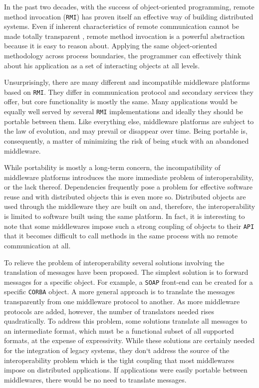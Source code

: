 In the past two decades, with the success of object-oriented programming, remote method invocation (\texttt{RMI})
has proven itself an effective way of building distributed systems. Even if inherent characteristics
of remote communication cannot be made totally transparent \cite{Kendall}, remote method
invocation is a powerful abstraction because it is easy to reason about. Applying the same object-oriented
methodology across process boundaries, the programmer can effectively think about his application as
a set of interacting objects at all levels.

Unsurprisingly, there are many different and incompatible middleware platforms based on \texttt{RMI}. They differ
in communication protocol and secondary services they offer, but core functionality is mostly the
same. Many applications would be equally well served by several \texttt{RMI} implementations and ideally they should
be portable between them. Like everything else, middleware platforms are subject to
the law of evolution, and may prevail or disappear over time. Being portable is, consequently, a matter of
minimizing the risk of being stuck with an abandoned middleware.

While portability is mostly a long-term concern, the incompatibility of middleware platforms introduces
the more immediate problem of interoperability, or the lack thereof. Dependencies frequently pose a problem
for effective software reuse and with distributed objects this is even more so. Distributed objects are used through
the middleware they are built on and, therefore, the interoperability is limited to software built using the
same platform. In fact, it is interesting to note that some middlewares impose such a strong coupling of objects to
their \texttt{API} that it becomes difficult to call methods in the same process with no remote communication at all.

To relieve the problem of interoperability several solutions involving the translation of messages have been
proposed. The simplest solution is to forward messages for a specific object. For example, a \texttt{SOAP} front-end can
be created for a specific \texttt{CORBA} object. A more general approach is to translate the messages transparently
from one middleware protocol to another. As more middleware protocols are added, however, the number of translators
needed rises quadratically. To address this problem, some solutions translate all messages to an intermediate format,
which must be a functional subset of all supported formats, at the expense of expressivity. While these solutions
are certainly needed for the integration of legacy systems, they don`t address the source of the interoperability
problem which is the tight coupling that most middlewares impose on distributed applications. If applications were
easily portable between middlewares, there would be no need to translate messages.

